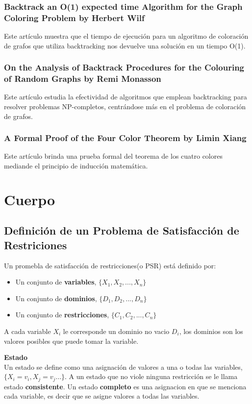\documentclass[a4paper]{article}
\begin{document}
\subsubsection{Backtrack an O(1) expected time Algorithm for the Graph Coloring Problem by Herbert Wilf}
Este artículo muestra que el tiempo de ejecución para un algoritmo de coloración de grafos que utiliza backtracking nos devuelve una solución en un tiempo O(1).
\subsubsection{On the Analysis of Backtrack Procedures for the Colouring of Random Graphs by Remi Monasson} 
Este artículo estudia la efectividad de algoritmos que emplean backtracking para resolver problemas NP-completos, centrándose más en el problema de coloración de grafos.
\subsubsection{A Formal Proof of the Four Color Theorem by Limin Xiang}
Este artículo brinda una prueba formal del teorema de los cuatro colores mediande el principio de inducción matemática.


\pagebreak

\section{Cuerpo}

\subsection{Definición de un  Problema de Satisfacción de Restriciones}
Un promebla de satisfacción de restricciones(o PSR) está definido por:
\begin{itemize}
	\item Un conjunto de \textbf{variables}, $\{X_1, X_2,..., X_n\}$
	\item Un conjunto de \textbf{dominios}, $\{D_1, D_2,..., D_n\}$
	\item Un conjunto de \textbf{restricciones}, $\{C_1, C_2,..., C_n\}$
\end{itemize} 
A cada variable $X_i$ le corresponde un dominio no vacio $D_i$, los dominios son los valores posibles que puede tomar la variable. 

\textbf{Estado}\\ 
Un estado se define como una asignación de valores a una o todas las variables, $\{X_i = v_i, X_j = v_j...\}$. A un estado que no viole ninguna restricción se le llama estado \textbf{consistente}. Un estado \textbf{completo} es una asignacion en que se menciona cada variable, es decir que se asigne valores a todas las variables.
\end{document}
